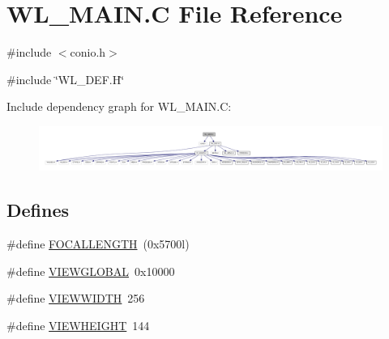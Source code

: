 \hypertarget{WL__MAIN_8C}{
\section{WL\_\-MAIN.C File Reference}
\label{WL__MAIN_8C}
}
{\ttfamily \#include $<$conio.h$>$}\par
{\ttfamily \#include \char`\"{}WL\_\-DEF.H\char`\"{}}\par
Include dependency graph for WL\_\-MAIN.C:
\nopagebreak
\begin{figure}[H]
\begin{center}
\leavevmode
\includegraphics[width=400pt]{WL__MAIN_8C__incl}
\end{center}
\end{figure}
\subsection*{Defines}
\begin{DoxyCompactItemize}
\item 
\#define \hyperlink{WL__MAIN_8C_ab633487e0599eaf29f624ed1ff705d3a}{FOCALLENGTH}~(0x5700l)
\item 
\#define \hyperlink{WL__MAIN_8C_a0b32ec8332adb0125574ea0426a15965}{VIEWGLOBAL}~0x10000
\item 
\#define \hyperlink{WL__MAIN_8C_af67316b9cea216c26c8d64e0ce74dd3d}{VIEWWIDTH}~256
\item 
\#define \hyperlink{WL__MAIN_8C_a7fd5033a7f8306c61fd129c8326dbd99}{VIEWHEIGHT}~144
\end{DoxyCompactItemize}
